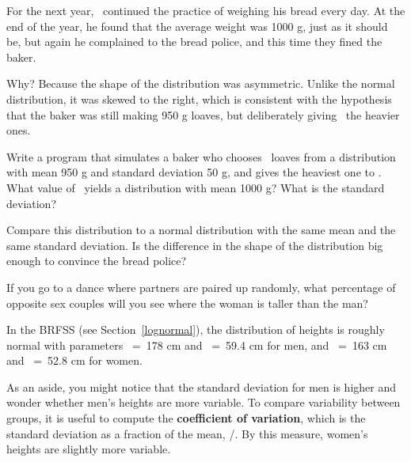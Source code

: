 \documentclass[12pt]{book}
\begin{document}
For the next year, \Poincare~continued the practice of weighing his
bread every day.  At the end of the year, he found that the average
weight was 1000 g, just as it should be, but again he complained to
the bread police, and this time they fined the baker.

Why?  Because the shape of the distribution was asymmetric.  Unlike
the normal distribution, it was skewed to the right, which is
consistent with the hypothesis that the baker was still making 950 g
loaves, but deliberately giving \Poincare~the heavier ones.


\begin{exercise}
Write a program that simulates a baker who chooses \n~loaves from a
distribution with mean 950 g and standard deviation 50 g, and gives
the heaviest one to \Poincare.  What value of \n~yields a
distribution with mean 1000 g?  What is the standard deviation?

Compare this distribution to a normal distribution with the same mean
and the same standard deviation.  Is the difference in the shape of
the distribution big enough to convince the bread police?

\end{exercise}


\begin{exercise}
\label{coef_var}
If you go to a dance where partners are paired up randomly, what
percentage of opposite sex couples will you see where the woman is
taller than the man?

In the BRFSS (see Section~\ref{lognormal}), the distribution of
heights is roughly normal with parameters \mymu~=~178 cm and
\sigmasq~=~59.4 cm for men, and \mymu~=~163 cm and \sigmasq~=~52.8 cm for
women.


As an aside, you might notice that the standard deviation for men is
higher and wonder whether men's heights are more variable.  To compare
variability between groups, it is useful to compute the {\bf
  coefficient of variation}, which is the standard deviation as a
fraction of the mean, \mysigma/\mymu.  By this measure, women's
heights are slightly more variable.


\end{exercise}
\end{document}
